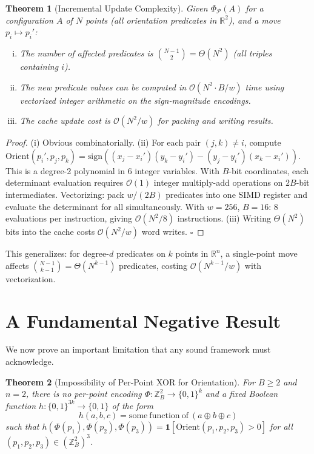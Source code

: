 \documentclass[11pt,letterpaper]{article}
\newtheorem{theorem}{Theorem}[section]
\newcommand{\ZBd}[1]{\mathbb{Z}_B^{#1}}
\newcommand{\RR}{\mathbb{R}}
\newcommand{\sign}{\mathrm{sign}}
\newcommand{\Orient}{\mathrm{Orient}}
\newcommand{\PhiP}{\Phi_{\mathcal{P}}}
\newcommand{\cO}{\mathcal{O}}
\newcommand{\wt}{w}       %
\begin{document}
\begin{theorem}[Incremental Update Complexity]\label{thm:incremental}
Given $\PhiP(A)$ for a configuration $A$ of $N$ points (all orientation predicates
in $\RR^2$), and a move $p_i\mapsto p_i'$:

\begin{enumerate}[(i)]
\item The number of affected predicates is $\binom{N-1}{2}=\Theta(N^2)$
  (all triples containing $i$).
\item The new predicate values can be computed in $\cO(N^2\cdot B/\wt)$ time using
  vectorized integer arithmetic on the sign-magnitude encodings.
\item The cache update cost is $\cO(N^2/\wt)$ for packing and writing results.
\end{enumerate}
\end{theorem}

\begin{proof}
(i) Obvious combinatorially.
(ii) For each pair $(j,k)\ne i$, compute
$\Orient(p_i',p_j,p_k)=\sign((x_j-x_i')(y_k-y_i')-(y_j-y_i')(x_k-x_i'))$.
This is a degree-2 polynomial in 6 integer variables.  With $B$-bit coordinates, each
determinant evaluation requires $\cO(1)$ integer multiply-add operations on $2B$-bit
intermediates.  Vectorizing: pack $\wt/(2B)$ predicates into one SIMD register and
evaluate the determinant for all simultaneously.  With $\wt=256$, $B=16$: 8 evaluations
per instruction, giving $\cO(N^2/8)$ instructions.  (iii) Writing $\Theta(N^2)$ bits
into the cache costs $\cO(N^2/\wt)$ word writes.  $\square$
\end{proof}

This generalizes: for degree-$d$ predicates on $k$ points in $\RR^n$, a single-point
move affects $\binom{N-1}{k-1}=\Theta(N^{k-1})$ predicates, costing $\cO(N^{k-1}/\wt)$
with vectorization.

\section{A Fundamental Negative Result}\label{sec:negative}

We now prove an important limitation that any sound framework must acknowledge.

\begin{negbox}
\begin{theorem}[Impossibility of Per-Point XOR for Orientation]\label{thm:negative}
For $B\ge 2$ and $n=2$, there is no per-point encoding $\Phi:\ZBd{2}\to\{0,1\}^k$ and
a fixed Boolean function $h:\{0,1\}^{3k}\to\{0,1\}$ of the form
\[
  h(a,b,c) = \mathrm{some\ function\ of\ }(a\oplus b\oplus c)
\]
such that $h(\Phi(p_1),\Phi(p_2),\Phi(p_3))=\mathbf{1}[\Orient(p_1,p_2,p_3)>0]$ for
all $(p_1,p_2,p_3)\in(\ZBd{2})^3$.
\end{theorem}
\end{negbox}
\end{document}
